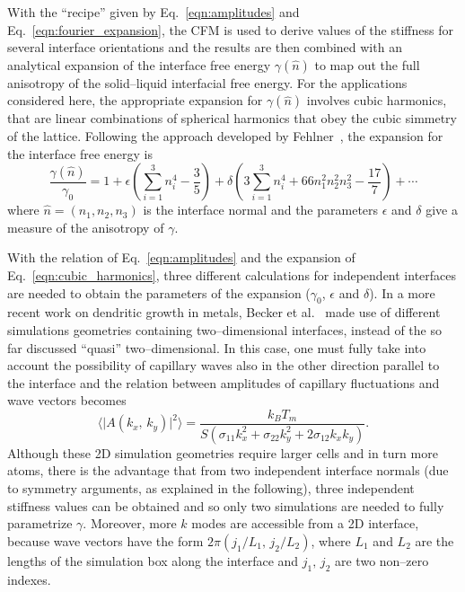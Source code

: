 With the ``recipe'' given by Eq.~\ref{eqn:amplitudes} and Eq.~\ref{eqn:fourier_expansion}, the CFM is used to derive values of the stiffness for several interface orientations and the results are then combined with an analytical expansion of the interface free energy $\gamma(\hat{n})$ to map out the full anisotropy of the solid--liquid interfacial free energy. For the applications considered here, the appropriate expansion for $\gamma(\hat{n})$ involves cubic harmonics, that are linear combinations of spherical harmonics that obey the cubic simmetry of the lattice. Following the approach developed by Fehlner~\cite{Fehlner1976}, the expansion for the interface free energy is
\begin{equation}
\label{eqn:cubic_harmonics}
    \frac{\gamma(\hat{n})}{\gamma_0} = 1 + \epsilon \left( \sum_{i=1}^3 n_i^4-\frac{3}{5}\right) + \delta \left( 3 \sum_{i=1}^3 n_i^{4}+ 66 n_1^2 n_2^2 n_3^2- \frac{17}{7}\right)+\cdots
\end{equation}
where $\hat{n}=(n_1,n_2,n_3)$ is the interface normal and the parameters $\epsilon$ and $\delta$ give a measure of the anisotropy of $\gamma$.

With the relation of Eq.~\ref{eqn:amplitudes} and the expansion of Eq.~\ref{eqn:cubic_harmonics}, three different calculations for independent interfaces are needed to obtain the parameters of the expansion ($\gamma_0$, $\epsilon$ and $\delta$). In a more recent work on dendritic growth in metals, Becker et al.~\cite{BeckerPRL2007} made use of different simulations geometries containing two--dimensional interfaces, instead of the so far discussed ``quasi'' two--dimensional. In this case, one must fully take into account the possibility of capillary waves also in the other direction parallel to the interface and the relation between amplitudes of capillary fluctuations and wave vectors becomes
\begin{equation}
    \langle \lvert A(k_x,\,k_y) \rvert^2 \rangle = \frac{k_B T_m}%
    {S( \sigma_{11}k_x^2 + \sigma_{22}k_y^2 + 2\sigma_{12}k_xk_y)}.
    \label{eqn:amplitudes_xy}
\end{equation}
Although these 2D simulation geometries require larger cells and in turn more atoms, there is the advantage that from two independent interface normals (due to symmetry arguments, as explained in the following), three independent stiffness values can be obtained and so only two simulations are needed to fully parametrize $\gamma$. Moreover, more $k$ modes are accessible from a 2D interface, because wave vectors have the form $2\pi(j_1/L_1,\,j_2/L_2)$, where $L_1$ and $L_2$ are the lengths of the simulation box along the interface and $j_1,\,j_2$ are two non--zero indexes.

